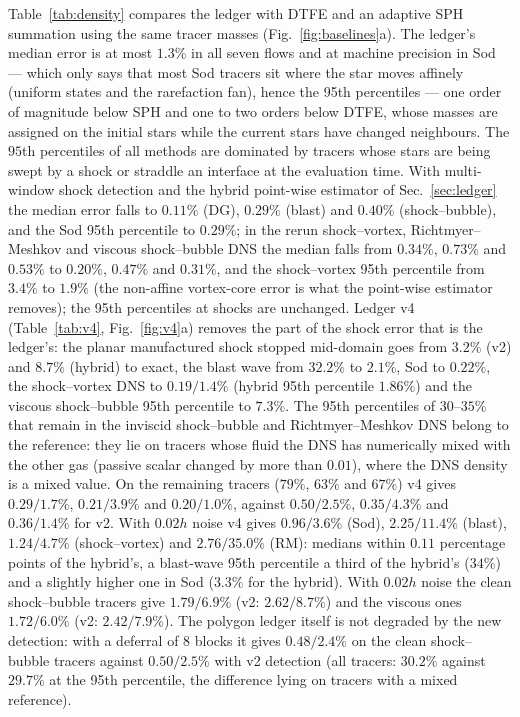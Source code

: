 \documentclass[11pt]{article}
\theoremstyle{definition}\newtheorem{definition}{Definition}\theoremstyle{remark}\newtheorem{remark}{Remark}
\begin{document}
Table~\ref{tab:density} compares the ledger with DTFE and an adaptive SPH summation using the same tracer masses (Fig.~\ref{fig:baselines}a). The ledger's median error is at most $1.3\%$ in all seven flows and at machine precision in Sod --- which only says that most Sod tracers sit where the star moves affinely (uniform states and the rarefaction fan), hence the 95th percentiles --- one order of magnitude below SPH and one to two orders below DTFE, whose masses are assigned on the initial stars while the current stars have changed neighbours. The $95$th percentiles of all methods are dominated by tracers whose stars are being swept by a shock or straddle an interface at the evaluation time. With multi-window shock detection and the hybrid point-wise estimator of Sec.~\ref{sec:ledger} the median error falls to $0.11\%$ (DG), $0.29\%$ (blast) and $0.40\%$ (shock--bubble), and the Sod 95th percentile to $0.29\%$; in the rerun shock--vortex, Richtmyer--Meshkov and viscous shock--bubble DNS the median falls from $0.34\%$, $0.73\%$ and $0.53\%$ to $0.20\%$, $0.47\%$ and $0.31\%$, and the shock--vortex 95th percentile from $3.4\%$ to $1.9\%$ (the non-affine vortex-core error is what the point-wise estimator removes); the 95th percentiles at shocks are unchanged. Ledger v4 (Table~\ref{tab:v4}, Fig.~\ref{fig:v4}a) removes the part of the shock error that is the ledger's: the planar manufactured shock stopped mid-domain goes from $3.2\%$ (v2) and $8.7\%$ (hybrid) to exact, the blast wave from $32.2\%$ to $2.1\%$, Sod to $0.22\%$, the shock--vortex DNS to $0.19 / 1.4\%$ (hybrid 95th percentile $1.86\%$) and the viscous shock--bubble 95th percentile to $7.3\%$. The 95th percentiles of $30$--$35\%$ that remain in the inviscid shock--bubble and Richtmyer--Meshkov DNS belong to the reference: they lie on tracers whose fluid the DNS has numerically mixed with the other gas (passive scalar changed by more than $0.01$), where the DNS density is a mixed value. On the remaining tracers ($79\%$, $63\%$ and $67\%$) v4 gives $0.29 / 1.7\%$, $0.21 / 3.9\%$ and $0.20 / 1.0\%$, against $0.50 / 2.5\%$, $0.35 / 4.3\%$ and $0.36 / 1.4\%$ for v2. With $0.02h$ noise v4 gives $0.96 / 3.6\%$ (Sod), $2.25 / 11.4\%$ (blast), $1.24 / 4.7\%$ (shock--vortex) and $2.76 / 35.0\%$ (RM): medians within $0.11$ percentage points of the hybrid's, a blast-wave 95th percentile a third of the hybrid's ($34\%$) and a slightly higher one in Sod ($3.3\%$ for the hybrid). With $0.02h$ noise the clean shock--bubble tracers give $1.79 / 6.9\%$ (v2: $2.62 / 8.7\%$) and the viscous ones $1.72 / 6.0\%$ (v2: $2.42 / 7.9\%$). The polygon ledger itself is not degraded by the new detection: with a deferral of $8$ blocks it gives $0.48 / 2.4\%$ on the clean shock--bubble tracers against $0.50 / 2.5\%$ with v2 detection (all tracers: $30.2\%$ against $29.7\%$ at the 95th percentile, the difference lying on tracers with a mixed reference).
\end{document}
